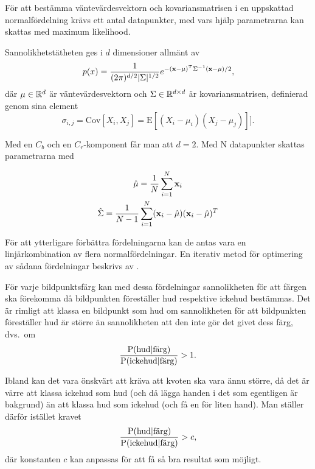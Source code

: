 \documentclass[../rapport_MVEX01-11-05]{subfiles}
\begin{document}
För att bestämma väntevärdesvektorn och kovariansmatrisen i en
uppskattad normalfördelning krävs ett
antal datapunkter, med vars hjälp parametrarna kan skattas med maximum
likelihood.

Sannolikhetstätheten ges i $d$ dimensioner allmänt av
\begin{equation*}
  p(x)=\frac{1}{(2\pi)^{d/2}|\Sigma|^{1/2}}e^{-(\mathbf{x}-\mu)^T\Sigma^{-1}(\mathbf{x}-\mu)/2},
\end{equation*}
där $\mu\in\mathbb{R}^d$ är väntevärdesvektorn och
$\Sigma\in\mathbb{R}^{d\times d}$ är kovariansmatrisen, definierad
genom sina element
\begin{equation*}
 \sigma_{i,j}=\text{Cov}[X_i,X_j]=\text{E}[(X_i-\mu_i)(X_j-\mu_j)]].
\end{equation*}

Med en $C_b$ och en $C_r$-komponent får man
att $d=2$. Med N datapunkter skattas parametrarna med

\begin{gather*}
  \hat\mu    =\frac{1}{N}\sum_{i=1}^N\mathbf{x}_i\\
  \hat\Sigma =\frac{1}{N-1}\sum_{i=1}^N(\mathbf{x}_i-\hat\mu)(\mathbf{x}_i-\hat\mu)^T
\end{gather*}

För att ytterligare förbättra fördelningarna kan de antas vara
en linjärkombination av flera normalfördelningar. En iterativ metod för optimering av
sådana fördelningar beskrivs av .

För varje bildpunktsfärg kan med dessa fördelningar sannolikheten för att färgen ska
förekomma då bildpunkten föreställer hud
respektive ickehud bestämmas. Det är rimligt att klassa en bildpunkt som
hud om sannolikheten för att bildpunkten föreställer hud är större än
sannolikheten att den inte gör det givet dess färg, dvs.~om
\begin{equation*}
	\frac{\mathrm{P}(\textrm{hud}|\textrm{färg})}{\mathrm{P}(\textrm{ickehud}|\textrm{färg})} > 1.
\end{equation*}

Ibland kan det vara önskvärt att kräva att kvoten ska vara ännu
större, då det är värre att klassa ickehud som hud (och då lägga
handen i det som egentligen är bakgrund) än att klassa hud som ickehud
(och få en för liten hand). Man ställer därför istället kravet 
\begin{equation*}
	\frac{\mathrm{P}(\textrm{hud}|\textrm{färg})}{\mathrm{P}(\textrm{ickehud}|\textrm{färg})} > c,
\end{equation*}
där konstanten $c$ kan anpassas för att få så bra resultat som möjligt.
\end{document}

